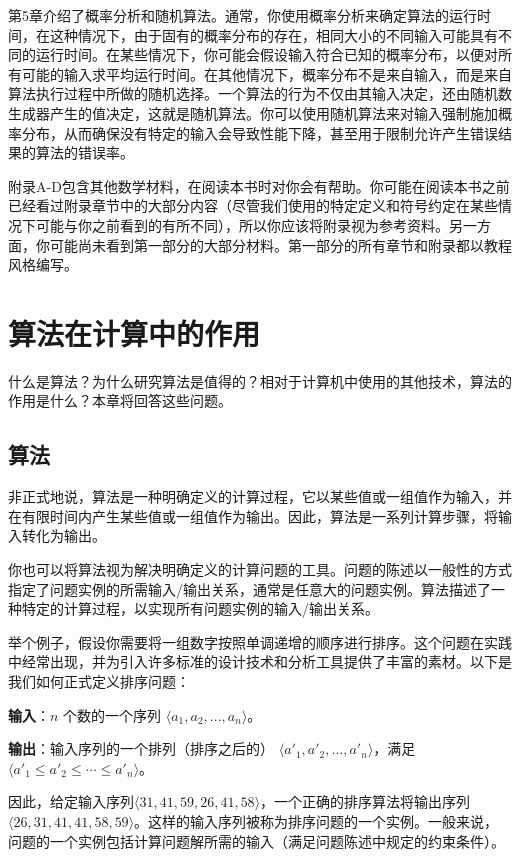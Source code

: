 \documentclass[lang=cn,newtx,10pt,scheme=chinese]{elegantbook}
\begin{document}
第5章介绍了概率分析和随机算法。通常，你使用概率分析来确定算法的运行时间，在这种情况下，由于固有的概率分布的存在，相同大小的不同输入可能具有不同的运行时间。在某些情况下，你可能会假设输入符合已知的概率分布，以便对所有可能的输入求平均运行时间。在其他情况下，概率分布不是来自输入，而是来自算法执行过程中所做的随机选择。一个算法的行为不仅由其输入决定，还由随机数生成器产生的值决定，这就是随机算法。你可以使用随机算法来对输入强制施加概率分布，从而确保没有特定的输入会导致性能下降，甚至用于限制允许产生错误结果的算法的错误率。

附录A-D包含其他数学材料，在阅读本书时对你会有帮助。你可能在阅读本书之前已经看过附录章节中的大部分内容（尽管我们使用的特定定义和符号约定在某些情况下可能与你之前看到的有所不同），所以你应该将附录视为参考资料。另一方面，你可能尚未看到第一部分的大部分材料。第一部分的所有章节和附录都以教程风格编写。

\chapter{算法在计算中的作用}

什么是算法？为什么研究算法是值得的？相对于计算机中使用的其他技术，算法的作用是什么？本章将回答这些问题。

\section{算法}

非正式地说，算法是一种明确定义的计算过程，它以某些值或一组值作为输入，并在有限时间内产生某些值或一组值作为输出。因此，算法是一系列计算步骤，将输入转化为输出。

你也可以将算法视为解决明确定义的计算问题的工具。问题的陈述以一般性的方式指定了问题实例的所需输入/输出关系，通常是任意大的问题实例。算法描述了一种特定的计算过程，以实现所有问题实例的输入/输出关系。

举个例子，假设你需要将一组数字按照单调递增的顺序进行排序。这个问题在实践中经常出现，并为引入许多标准的设计技术和分析工具提供了丰富的素材。以下是我们如何正式定义排序问题：

\textbf{输入}：$n$ 个数的一个序列 $\langle a_1, a_2, ..., a_n\rangle$。

\textbf{输出}：输入序列的一个排列（排序之后的） $\langle{a'_1,a'_2,...,a'_n}\rangle$，满足$\langle{a'_1\le a'_2\le \cdots\le a'_n}\rangle$。

因此，给定输入序列$\langle{31,41,59,26,41,58}\rangle$，一个正确的排序算法将输出序列 $\langle{26,31,41,41,58,59}\rangle$。这样的输入序列被称为排序问题的一个实例。一般来说，问题的一个实例包括计算问题解所需的输入（满足问题陈述中规定的约束条件）。
\end{document}
